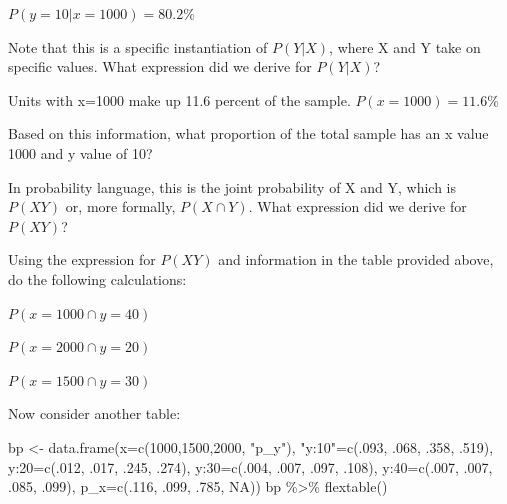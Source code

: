 \documentclass[
  letterpaper,
  DIV=11,
  numbers=noendperiod,
  oneside]{scrartcl}
\newenvironment{Shaded}{\begin{snugshade}}{\end{snugshade}}
\newcommand{\AttributeTok}[1]{\textcolor[rgb]{0.40,0.45,0.13}{#1}}
\newcommand{\ConstantTok}[1]{\textcolor[rgb]{0.56,0.35,0.01}{#1}}
\newcommand{\DecValTok}[1]{\textcolor[rgb]{0.68,0.00,0.00}{#1}}
\newcommand{\FunctionTok}[1]{\textcolor[rgb]{0.28,0.35,0.67}{#1}}
\newcommand{\NormalTok}[1]{\textcolor[rgb]{0.00,0.23,0.31}{#1}}
\newcommand{\OtherTok}[1]{\textcolor[rgb]{0.00,0.23,0.31}{#1}}
\newcommand{\SpecialCharTok}[1]{\textcolor[rgb]{0.37,0.37,0.37}{#1}}
\newcommand{\StringTok}[1]{\textcolor[rgb]{0.13,0.47,0.30}{#1}}
\begin{document}
\(P(y=10|x=1000)=80.2\%\)

Note that this is a specific instantiation of \(P(Y|X)\), where X and Y
take on specific values. What expression did we derive for \(P(Y|X)\)?

Units with x=1000 make up 11.6 percent of the sample.
\(P(x=1000)=11.6\%\)

Based on this information, what proportion of the total sample has an x
value 1000 and y value of 10?

In probability language, this is the joint probability of X and Y, which
is \(P(XY)\) or, more formally, \(P(X\cap Y)\). What expression did we
derive for \(P(XY)\)?

Using the expression for \(P(XY)\) and information in the table provided
above, do the following calculations:

\(P(x=1000 \cap y=40)\)

\(P(x=2000\cap y=20)\)

\(P(x=1500\cap y=30)\)

Now consider another table:

\begin{Shaded}
\begin{Highlighting}[]
\NormalTok{bp }\OtherTok{\textless{}{-}} \FunctionTok{data.frame}\NormalTok{(}\AttributeTok{x=}\FunctionTok{c}\NormalTok{(}\DecValTok{1000}\NormalTok{,}\DecValTok{1500}\NormalTok{,}\DecValTok{2000}\NormalTok{, }\StringTok{"p\_y"}\NormalTok{),}
                 \StringTok{"y:10"}\OtherTok{=}\FunctionTok{c}\NormalTok{(.}\DecValTok{093}\NormalTok{, .}\DecValTok{068}\NormalTok{, .}\DecValTok{358}\NormalTok{, .}\DecValTok{519}\NormalTok{),}
                 \StringTok{\textasciigrave{}}\AttributeTok{y:20}\StringTok{\textasciigrave{}}\OtherTok{=}\FunctionTok{c}\NormalTok{(.}\DecValTok{012}\NormalTok{, .}\DecValTok{017}\NormalTok{, .}\DecValTok{245}\NormalTok{, .}\DecValTok{274}\NormalTok{),}
                 \StringTok{\textasciigrave{}}\AttributeTok{y:30}\StringTok{\textasciigrave{}}\OtherTok{=}\FunctionTok{c}\NormalTok{(.}\DecValTok{004}\NormalTok{, .}\DecValTok{007}\NormalTok{, .}\DecValTok{097}\NormalTok{, .}\DecValTok{108}\NormalTok{),}
                 \StringTok{\textasciigrave{}}\AttributeTok{y:40}\StringTok{\textasciigrave{}}\OtherTok{=}\FunctionTok{c}\NormalTok{(.}\DecValTok{007}\NormalTok{, .}\DecValTok{007}\NormalTok{, .}\DecValTok{085}\NormalTok{, .}\DecValTok{099}\NormalTok{),}
                 \StringTok{\textasciigrave{}}\AttributeTok{p\_x}\StringTok{\textasciigrave{}}\OtherTok{=}\FunctionTok{c}\NormalTok{(.}\DecValTok{116}\NormalTok{, .}\DecValTok{099}\NormalTok{, .}\DecValTok{785}\NormalTok{, }\ConstantTok{NA}\NormalTok{))}
\NormalTok{bp }\SpecialCharTok{\%\textgreater{}\%}
  \FunctionTok{flextable}\NormalTok{()}
\end{Highlighting}
\end{Shaded}
\end{document}
